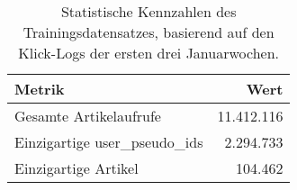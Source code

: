 
\begin{table}[H]
    \centering
    \caption{Statistische Kennzahlen des Trainingsdatensatzes, basierend auf den Klick-Logs der ersten drei Januarwochen.}
    \label{tab:train_stats}
    \begin{tabular}{lr}
        \toprule
        \textbf{Metrik} & \textbf{Wert} \\
        \midrule
        Gesamte Artikelaufrufe & 11.412.116 \\
        Einzigartige user\_pseudo\_ids & 2.294.733 \\
        Einzigartige Artikel & 104.462 \\
        \bottomrule
    \end{tabular}
\end{table}